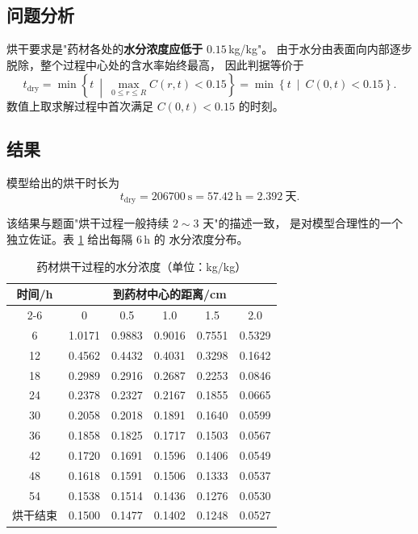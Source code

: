 \documentclass[12pt,a4paper]{ctexart}
\begin{document}
\subsection{问题分析}

烘干要求是"药材各处的\textbf{水分浓度应低于} $0.15$\,kg/kg"。
由于水分由表面向内部逐步脱除，整个过程中心处的含水率始终最高，
因此判据等价于
\begin{equation}
  t_{\mathrm{dry}}=\min\left\{t\ \middle|\
  \max_{0\le r\le R}C(r,t)<0.15\right\}
  =\min\left\{t\ \middle|\ C(0,t)<0.15\right\}.
  \label{eq:p3-criterion}
\end{equation}
数值上取求解过程中首次满足 $C(0,t)<0.15$ 的时刻。

\subsection{结果}

模型给出的烘干时长为
\begin{equation}
  t_{\mathrm{dry}}=206700\ \mathrm{s}=57.42\ \mathrm{h}=2.392\ \text{天}.
\end{equation}

该结果与题面"烘干过程一般持续 $2\sim3$ 天"的描述一致，
是对模型合理性的一个独立佐证。表 \ref{tab:p3} 给出每隔 $6$\,h 的
水分浓度分布。

\begin{table}[htbp]
  \centering
  \caption{药材烘干过程的水分浓度（单位：kg/kg）}
  \label{tab:p3}
  \begin{tabular}{cccccc}
    \toprule
    \multirow{2}{*}{时间/h} & \multicolumn{5}{c}{到药材中心的距离/cm} \\
    \cmidrule(lr){2-6}
     & 0     & 0.5   & 1.0   & 1.5   & 2.0 \\
    \midrule
    6  & 1.0171 & 0.9883 & 0.9016 & 0.7551 & 0.5329 \\
    12 & 0.4562 & 0.4432 & 0.4031 & 0.3298 & 0.1642 \\
    18 & 0.2989 & 0.2916 & 0.2687 & 0.2253 & 0.0846 \\
    24 & 0.2378 & 0.2327 & 0.2167 & 0.1855 & 0.0665 \\
    30 & 0.2058 & 0.2018 & 0.1891 & 0.1640 & 0.0599 \\
    36 & 0.1858 & 0.1825 & 0.1717 & 0.1503 & 0.0567 \\
    42 & 0.1720 & 0.1691 & 0.1596 & 0.1406 & 0.0549 \\
    48 & 0.1618 & 0.1591 & 0.1506 & 0.1333 & 0.0537 \\
    54 & 0.1538 & 0.1514 & 0.1436 & 0.1276 & 0.0530 \\
    烘干结束 & 0.1500 & 0.1477 & 0.1402 & 0.1248 & 0.0527 \\
    \bottomrule
  \end{tabular}
\end{table}
\end{document}
